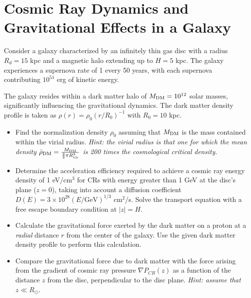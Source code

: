 \section{Cosmic Ray Dynamics and Gravitational Effects in a Galaxy}

Consider a galaxy characterized by an infinitely thin gas disc with a radius \(R_d = 15\) kpc and a magnetic halo extending up to \(H = 5\) kpc. The galaxy experiences a supernova rate of 1 every 50 years, with each supernova contributing \(10^{51}\) erg of kinetic energy. 

The galaxy resides within a dark matter halo of \(M_{\rm DM} = 10^{12}\) solar masses, significantly influencing the gravitational dynamics. The dark matter density profile is taken as \(\rho(r) = \rho_0 (r / R_0)^{-1}\) with \(R_0 = 10 \) kpc.  

\begin{itemize}
\item Find the normalization density \( \rho_0 \) assuming that  \( M_{\rm DM} \) is the mass contained within the virial radius. \emph{Hint:  the virial radius is that one for which the mean density $\bar \rho_{\rm DM} = \frac{M_{\rm DM}}{\frac{4}{3} \pi R_{\rm vir}^3}$ is 200 times the cosmological critical density.}

\item Determine the acceleration efficiency required to achieve a cosmic ray energy density of 1 eV/cm\(^3\) for CRs with energy greater than 1 GeV at the disc's plane (\(z = 0\)), taking into account a diffusion coefficient \(D(E) = 3 \times 10^{28} (E / \text{GeV})^{1/3}\) cm\(^2\)/s. Solve the transport equation with a free escape boundary condition at \(|z| = H\). 

\item Calculate the gravitational force exerted by the dark matter on a proton at a \emph{radial} distance \( r \) from the center of the galaxy. Use the given dark matter density profile to perform this calculation.

\item Compare the gravitational force due to dark matter with the force arising from the gradient of cosmic ray pressure \(\nabla P_{CR}(z)\)  as a function of the distance \(z\) from the disc, perpendicular to the disc plane. \emph{Hint: assume that \( z \ll R_\odot \)}.

\end{itemize}
